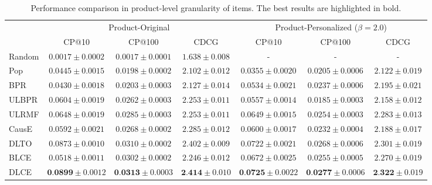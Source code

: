 \documentclass[manuscript,screen]{acmart}
\begin{document}
\begin{table}[htbp]
	\small
	\caption{Performance comparison in product-level granularity of items.
		The best results are highlighted in bold.}
	\label{tab:comparison_product}
	\centering
	\begin{tabular}{lcccccc}
		\toprule
		& \multicolumn{3}{c}{Product-Original} & \multicolumn{3}{c}{Product-Personalized ($\beta = 2.0$)}\\
		\cmidrule(lr){2-4} \cmidrule(lr){5-7} 
		& CP@10 & CP@100 & CDCG & CP@10 & CP@100 & CDCG \\
		\midrule
		Random & $0.0017 \pm 0.0002$ & $0.0017 \pm 0.0001$ & $1.638 \pm 0.008$ 
		&- & - & -  \\
		Pop & $0.0445 \pm 0.0015$ & $0.0198 \pm 0.0002$ & $2.102 \pm 0.012$
		&$0.0355 \pm 0.0020$ & $0.0205 \pm 0.0006$ & $2.122 \pm 0.019$  \\
		BPR & $0.0430 \pm 0.0018$ & $0.0203 \pm 0.0003$ & $2.127 \pm 0.014$ 
		&$0.0534 \pm 0.0021$ & $0.0237 \pm 0.0006$ & $2.195 \pm 0.021$  \\
		\midrule
		ULBPR &$0.0604 \pm 0.0019$ & $0.0262 \pm 0.0003$ & $2.253 \pm 0.011$
		&$0.0557 \pm 0.0014$ & $0.0185 \pm 0.0003$ & $2.158 \pm 0.012$  \\
		ULRMF &$0.0648 \pm 0.0019$ & $0.0285 \pm 0.0003$ & $2.253 \pm 0.011$
		&$0.0649 \pm 0.0015$ & $0.0254 \pm 0.0003$ & $2.283 \pm 0.013$  \\
		CausE &$0.0592 \pm 0.0021$ & $0.0268 \pm 0.0002$ & $2.285 \pm 0.012$
		&$0.0600 \pm 0.0017$ & $0.0232 \pm 0.0004$ & $2.188 \pm 0.017$  \\
		DLTO &$0.0873 \pm 0.0010$ & $0.0310 \pm 0.0002$ & $2.402 \pm 0.009$ 
		&$0.0722 \pm 0.0021$ & $0.0268 \pm 0.0006$ & $2.301 \pm 0.019$  \\
		BLCE &$0.0518 \pm 0.0011$ & $0.0302 \pm 0.0002$ & $2.246 \pm 0.012$
		&$0.0672 \pm 0.0025$ & $0.0255 \pm 0.0005$ & $2.270 \pm 0.019$  \\
		DLCE &$\textbf{0.0899} \pm 0.0012$ & $\textbf{0.0313} \pm 0.0003$ & $\textbf{2.414} \pm 0.010$ 
		&$\textbf{0.0725} \pm 0.0022$ & $\textbf{0.0277} \pm 0.0006$ & $\textbf{2.322} \pm 0.019$  \\
		\bottomrule
	\end{tabular}
\end{table}
\end{document}
